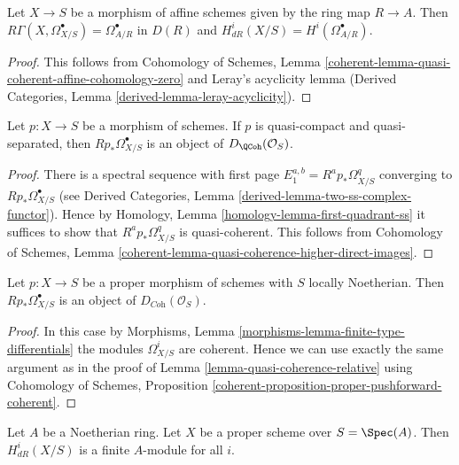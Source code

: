 \begin{lemma}
\label{lemma-de-rham-affine}
Let $X \to S$ be a morphism of affine schemes given by the ring map
$R \to A$. Then $R\Gamma(X, \Omega^\bullet_{X/S}) = \Omega^\bullet_{A/R}$
in $D(R)$ and $H^i_{dR}(X/S) = H^i(\Omega^\bullet_{A/R})$.
\end{lemma}

\begin{proof}
This follows from Cohomology of Schemes, Lemma
\ref{coherent-lemma-quasi-coherent-affine-cohomology-zero}
and Leray's acyclicity lemma
(Derived Categories, Lemma \ref{derived-lemma-leray-acyclicity}).
\end{proof}

\begin{lemma}
\label{lemma-quasi-coherence-relative}
Let $p : X \to S$ be a morphism of schemes. If $p$ is quasi-compact
and quasi-separated, then $Rp_*\Omega^\bullet_{X/S}$ is an object
of $D_\QCoh(\mathcal{O}_S)$.
\end{lemma}

\begin{proof}
There is a spectral sequence with first page
$E_1^{a, b} = R^ap_*\Omega^q_{X/S}$ converging to $Rp_*\Omega^\bullet_{X/S}$
(see Derived Categories, Lemma \ref{derived-lemma-two-ss-complex-functor}).
Hence by Homology, Lemma \ref{homology-lemma-first-quadrant-ss}
it suffices to show that $R^ap_*\Omega^q_{X/S}$ is quasi-coherent.
This follows from Cohomology of Schemes, Lemma
\ref{coherent-lemma-quasi-coherence-higher-direct-images}.
\end{proof}

\begin{lemma}
\label{lemma-coherence-relative}
Let $p : X \to S$ be a proper morphism of schemes with $S$ locally
Noetherian. Then $Rp_*\Omega^\bullet_{X/S}$ is an object
of $D_{\textit{Coh}}(\mathcal{O}_S)$.
\end{lemma}

\begin{proof}
In this case by Morphisms, Lemma \ref{morphisms-lemma-finite-type-differentials}
the modules $\Omega^i_{X/S}$ are coherent. Hence we can use exactly the
same argument as in the proof of Lemma \ref{lemma-quasi-coherence-relative}
using Cohomology of Schemes, Proposition
\ref{coherent-proposition-proper-pushforward-coherent}.
\end{proof}

\begin{lemma}
\label{lemma-finite-de-Rham}
Let $A$ be a Noetherian ring. Let $X$ be a proper scheme over $S = \Spec(A)$.
Then $H^i_{dR}(X/S)$ is a finite $A$-module for all $i$.
\end{lemma}

